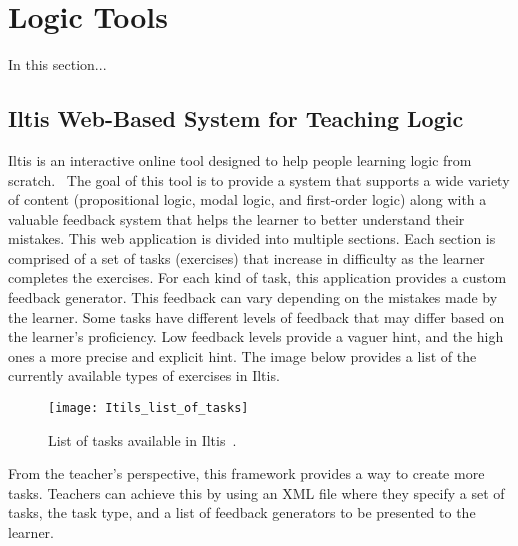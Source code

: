 
%

\chapter{Logic Tools}

In this section...

\section{Iltis Web-Based System for Teaching Logic}

Iltis is an interactive online tool designed to help people learning logic from scratch.~\cite{arxivIltisLearning, arxiv} The goal of this tool is to provide a system that supports a wide variety of content (propositional logic, modal logic, and first-order logic) along with a valuable feedback system that helps the learner to better understand their mistakes. This web application is divided into multiple sections. Each section is comprised of a set of tasks (exercises) that increase in difficulty as the learner completes the exercises. For each kind of task, this application provides a custom feedback generator. This feedback can vary depending on the mistakes made by the learner. Some tasks have different levels of feedback that may differ based on the learner’s proficiency. Low feedback levels provide a vaguer hint, and the high ones a more precise and explicit hint. The image below provides a list of the currently available types of exercises in Iltis.

\begin{figure}[htbp]
    \centering
    \texttt{[image: Itils\_list\_of\_tasks]}
    \caption{List of tasks available in Iltis~\cite{arxiv}.}
\end{figure}

From the teacher’s perspective, this framework provides a way to create more tasks. Teachers can achieve this by using an XML file where they specify a set of tasks, the task type, and a list of feedback generators to be presented to the learner.


